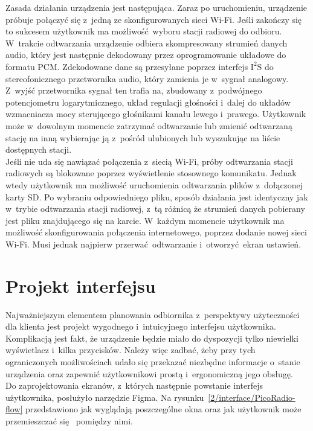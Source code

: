 \documentclass[polish]{aghengthesis}
\newcommand{\isqs}{$\text{I}^{2}\text{S}$}
\begin{document}
			Zasada działania urządzenia jest następująca.
			Zaraz po uruchomieniu, urządzenie próbuje połączyć się z~jedną ze skonfigurowanych sieci Wi-Fi.
			Jeśli zakończy się to sukcesem użytkownik ma możliwość wyboru stacji radiowej do odbioru. W~trakcie odtwarzania urządzenie odbiera skompresowany strumień danych audio, który jest następnie dekodowany przez oprogramowanie układowe do formatu PCM. Zdekodowane dane są przesyłane poprzez interfejs \isqs{} do stereofonicznego przetwornika audio, który zamienia je w~sygnał analogowy. Z~wyjść przetwornika sygnał ten trafia na, zbudowany z~podwójnego potencjometru logarytmicznego, układ regulacji głośności i~dalej do układów wzmacniacza mocy sterującego głośnikami kanału lewego i~prawego.
			Użytkownik może w~dowolnym momencie zatrzymać odtwarzanie lub zmienić odtwarzaną stację na inną wybierając ją z~pośród ulubionych lub wyszukując na liście dostępnych stacji.
			$ $\\
			
			Jeśli nie uda się nawiązać połączenia z~siecią Wi-Fi, próby odtwarzania stacji radiowych są blokowane poprzez wyświetlenie stosownego komunikatu.
			Jednak wtedy użytkownik ma możliwość uruchomienia odtwarzania plików z~dołączonej karty SD. Po wybraniu odpowiedniego pliku, sposób działania jest identyczny jak w~trybie odtwarzania stacji radiowej, z~tą różnicą że strumień danych pobierany jest pliku znajdującego się na karcie. 
			W~każdym momencie użytkownik ma możliwość skonfigurowania połączenia internetowego, poprzez dodanie nowej sieci Wi-Fi.
			Musi jednak najpierw przerwać odtwarzanie i~otworzyć ekran ustawień.
	
	\section{Projekt interfejsu}
		\label{sec:ui}
		Najważniejszym elementem planowania odbiornika z~perspektywy użyteczności dla klienta jest projekt wygodnego i~intuicyjnego interfejsu użytkownika. Komplikacją jest fakt, że urządzenie będzie miało do dyspozycji tylko niewielki wyświetlacz i~kilka przycisków.
		Należy więc zadbać, żeby przy tych ograniczonych możliwościach udało się przekazać niezbędne informacje o~stanie urządzenia oraz zapewnić użytkownikowi prostą i~ergonomiczną jego obsługę.
		$ $\\

		Do zaprojektowania ekranów, z~których następnie powstanie interfejs użytkownika, posłużyło narzędzie Figma\textsuperscript{\cite{figma}}. Na rysunku~\ref{2/interface/PicoRadio-flow} przedstawiono jak wyglądają poszczególne okna oraz jak użytkownik może przemieszczać się  pomiędzy nimi.
		
\end{document}
